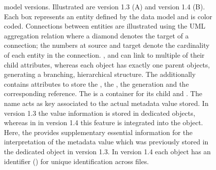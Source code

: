 \begin{figure}[hp]
    \centering
    \scalebox{1}{
    }
    \caption[ model versions]{ model versions. Illustrated are  version 1.3 (A) and version 1.4 (B). Each box represents an entity defined by the data model and is color coded. Connections between entities are illustrated using the UML aggregation relation where a diamond denotes the target of a connection; the numbers at source and target denote the cardinality of each entity in the connection. ,  and  can link to multiple of their child attributes, whereas each object has exactly one parent objects, generating a branching, hierarchical structure. The  additionally contains attributes to store the , the , the generation  and the corresponding  reference. The  is a container for its child  and . The  name acts as key associated to the actual metadata value stored. In  version 1.3 the value information is stored in dedicated  objects, whereas in in  version 1.4 this feature is integrated into the  object. Here, the  provides supplementary essential information for the interpretation of the metadata value which was previously stored in the dedicated  object in  version 1.3. In  version 1.4 each object has an identifier () for unique identification across files.}
    \label{fig:intro_odML_model}
\end{figure}

